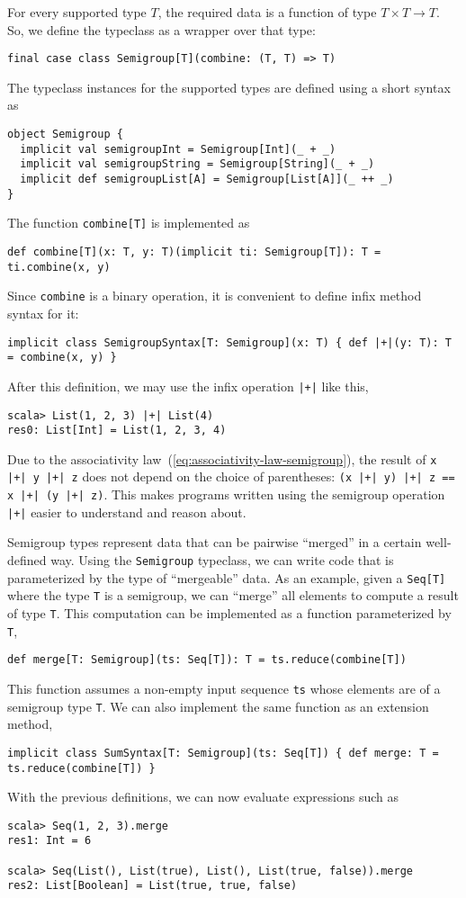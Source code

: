 For every supported type $T$, the required data is a function of
type $T\times T\rightarrow T$. So, we define the typeclass as a wrapper
over that type:
\begin{lstlisting}
final case class Semigroup[T](combine: (T, T) => T)
\end{lstlisting}
The typeclass instances for the supported types are defined using
a short syntax as
\begin{lstlisting}
object Semigroup {
  implicit val semigroupInt = Semigroup[Int](_ + _)
  implicit val semigroupString = Semigroup[String](_ + _)
  implicit def semigroupList[A] = Semigroup[List[A]](_ ++ _)
}
\end{lstlisting}
The function \lstinline!combine[T]! is implemented as
\begin{lstlisting}
def combine[T](x: T, y: T)(implicit ti: Semigroup[T]): T = ti.combine(x, y)
\end{lstlisting}
Since \lstinline!combine! is a binary operation, it is convenient
to define infix method syntax for it:
\begin{lstlisting}
implicit class SemigroupSyntax[T: Semigroup](x: T) { def |+|(y: T): T = combine(x, y) }
\end{lstlisting}
After this definition, we may use the infix operation \lstinline!|+|!
like this,
\begin{lstlisting}
scala> List(1, 2, 3) |+| List(4)
res0: List[Int] = List(1, 2, 3, 4)
\end{lstlisting}
Due to the associativity law~(\ref{eq:associativity-law-semigroup}),
the result of \lstinline!x |+| y |+| z! does not depend on the choice
of parentheses: \lstinline!(x |+| y) |+| z == x |+| (y |+| z)!. This
makes programs written using the semigroup operation \lstinline!|+|!
easier to understand and reason about.

Semigroup types represent data that can be pairwise \textsf{``}merged\textsf{''} in
a certain well-defined way. Using the \lstinline!Semigroup! typeclass,
we can write code that is parameterized by the type of \textsf{``}mergeable\textsf{''}
data. As an example, given a \lstinline!Seq[T]! where the type \lstinline!T!
is a semigroup, we can \textsf{``}merge\textsf{''} all elements to compute a result
of type \lstinline!T!. This computation can be implemented as a function
parameterized by \lstinline!T!,
\begin{lstlisting}
def merge[T: Semigroup](ts: Seq[T]): T = ts.reduce(combine[T])
\end{lstlisting}
This function assumes a non-empty input sequence \lstinline!ts! whose
elements are of a semigroup type \lstinline!T!. We can also implement
the same function as an extension method,
\begin{lstlisting}
implicit class SumSyntax[T: Semigroup](ts: Seq[T]) { def merge: T = ts.reduce(combine[T]) }
\end{lstlisting}
With the previous definitions, we can now evaluate expressions such
as
\begin{lstlisting}
scala> Seq(1, 2, 3).merge
res1: Int = 6

scala> Seq(List(), List(true), List(), List(true, false)).merge
res2: List[Boolean] = List(true, true, false)
\end{lstlisting}

